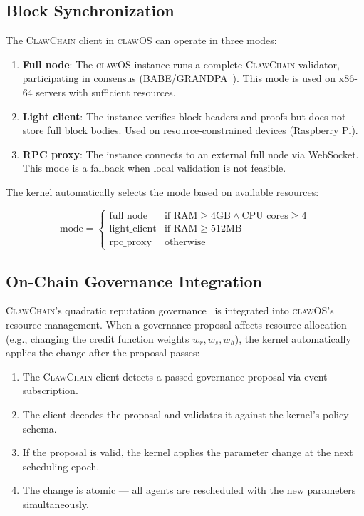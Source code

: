 \documentclass{article}
\newcommand{\clawos}{\textsc{clawOS}}
\newcommand{\clawchain}{\textsc{ClawChain}}
\begin{document}
\subsection{Block Synchronization}

The \clawchain{} client in \clawos{} can operate in three modes:

\begin{enumerate}[leftmargin=*]
    \item \textbf{Full node}: The \clawos{} instance runs a complete \clawchain{} validator, participating in consensus (BABE/GRANDPA~\cite{parity2024substrate}). This mode is used on x86-64 servers with sufficient resources.
    
    \item \textbf{Light client}: The instance verifies block headers and proofs but does not store full block bodies. Used on resource-constrained devices (Raspberry Pi).
    
    \item \textbf{RPC proxy}: The instance connects to an external full node via WebSocket. This mode is a fallback when local validation is not feasible.
\end{enumerate}

The kernel automatically selects the mode based on available resources:

$$\text{mode} = \begin{cases}
    \text{full\_node} & \text{if RAM} \geq 4\text{GB} \wedge \text{CPU cores} \geq 4 \\
    \text{light\_client} & \text{if RAM} \geq 512\text{MB} \\
    \text{rpc\_proxy} & \text{otherwise}
\end{cases}$$

\subsection{On-Chain Governance Integration}

\clawchain{}'s quadratic reputation governance~\cite{chen2026clawchain} is integrated into \clawos{}'s resource management. When a governance proposal affects resource allocation (e.g., changing the credit function weights $w_r, w_s, w_h$), the kernel automatically applies the change after the proposal passes:

\begin{enumerate}[leftmargin=*]
    \item The \clawchain{} client detects a passed governance proposal via event subscription.
    \item The client decodes the proposal and validates it against the kernel's policy schema.
    \item If the proposal is valid, the kernel applies the parameter change at the next scheduling epoch.
    \item The change is atomic — all agents are rescheduled with the new parameters simultaneously.
\end{enumerate}
\end{document}
